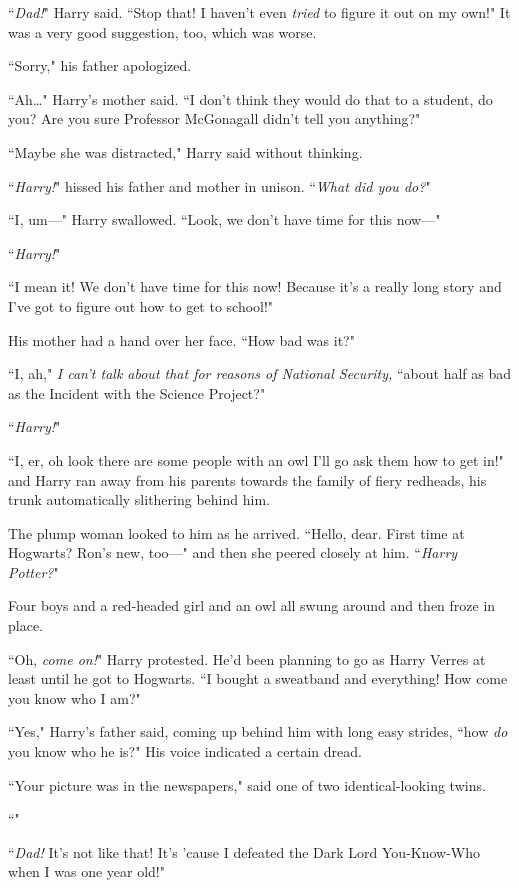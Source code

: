 ``\emph{Dad!}" Harry said. ``Stop that! I haven't even \emph{tried} to figure it out on my own!" It was a very good suggestion, too, which was worse.

``Sorry," his father apologized.

``Ah{\ldots}" Harry's mother said. ``I don't think they would do that to a student, do you? Are you sure Professor McGonagall didn't tell you anything?"

``Maybe she was distracted," Harry said without thinking.

``\emph{Harry!}" hissed his father and mother in unison. ``\emph{What did you do?}"

``I, um—" Harry swallowed. ``Look, we don't have time for this now—"

``\emph{Harry!}"

``I mean it! We don't have time for this now! Because it's a really long story and I've got to figure out how to get to school!"

His mother had a hand over her face. ``How bad was it?"

``I, ah," \emph{I can't talk about that for reasons of National Security,} ``about half as bad as the Incident with the Science Project?"

``\emph{Harry!}"

``I, er, oh look there are some people with an owl I'll go ask them how to get in!" and Harry ran away from his parents towards the family of fiery redheads, his trunk automatically slithering behind him.

The plump woman looked to him as he arrived. ``Hello, dear. First time at Hogwarts? Ron's new, too—" and then she peered closely at him. ``\emph{Harry Potter?}"

Four boys and a red-headed girl and an owl all swung around and then froze in place.

``Oh, \emph{come on!}" Harry protested. He'd been planning to go as Harry Verres at least until he got to Hogwarts. ``I bought a sweatband and everything! How come you know who I am?"

``Yes," Harry's father said, coming up behind him with long easy strides, ``how \emph{do} you know who he is?" His voice indicated a certain dread.

``Your picture was in the newspapers," said one of two identical-looking twins.

``"

``\emph{Dad!} It's not like that! It's 'cause I defeated the Dark Lord You-Know-Who when I was one year old!"

